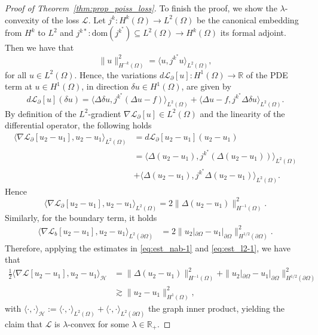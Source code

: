 \documentclass[pdflatex]{sn-jnl}%
\begin{document}
\begin{proof}[Proof of Theorem~\ref{thm:prop_poiss_loss}]
To finish the proof, we show the $\lambda$-convexity of the loss $\mathcal{L}$. Let $j^k:H^k(\Omega)\rightarrow L^2(\Omega)$ be the canonical embedding from $H^k$ to $L^2$ and $j^{k*}:\mathrm{dom}(j^{k^*})\subseteq L^2(\Omega)\rightarrow H^k(\Omega)$ its formal adjoint. Then we have that 
\begin{equation}
    \|u\|_{H^{-k}(\Omega)}^2 = \langle u, j^{k^*} u\rangle_{L^2(\Omega)},
\end{equation}
for all $u\in L^2(\Omega)$. Hence, the variations $d\mathcal{L}_\partial[u]:H^1(\Omega)\rightarrow\mathbb{R}$ of the PDE term at $u\in H^1(\Omega)$, in direction $\delta u\in H^1(\Omega)$, are given by
\begin{equation}
    d\mathcal{L}_\partial[u](\delta u) =  \langle \Delta \delta u, j^{k^*} (\Delta u -f)\rangle_{L^2(\Omega)}+\langle \Delta u -f, j^{k^*} \Delta \delta u \rangle_{L^2(\Omega)}.
\end{equation}
By definition of the $L^2$-gradient $\nabla\mathcal{L}_\partial[u]\in L^2(\Omega)$ and the linearity of the differential operator, the following holds
\begin{equation}
\begin{aligned}
        \langle \nabla\mathcal{L}_\partial[u_2-u_1],u_2-u_1\rangle_{L^2(\Omega)} &=d\mathcal{L}_\partial[u_2-u_1](u_2-u_1)\\&  
        =\langle \Delta (u_2-u_1), j^{k^*} (\Delta (u_2-u_1))\rangle_{L^2(\Omega)}\\&+\langle \Delta (u_2-u_1), j^{k^*} \Delta (u_2-u_1) \rangle_{L^2(\Omega)}.
    \end{aligned}
\end{equation}
Hence 
\begin{equation}
    \langle \nabla\mathcal{L}_\partial[u_2-u_1],u_2-u_1\rangle_{L^2(\Omega)} = 2\|\Delta (u_2-u_1)\|_{H^{-1}(\Omega)}^2.
\end{equation}
Similarly, for the boundary term, it holds
\begin{equation}
    \begin{aligned}
        \langle \nabla\mathcal{L}_b[u_2-u_1],u_2-u_1\rangle_{L^2(\partial\Omega)} &
        =2\|u_2|_{\partial\Omega}-u_1|_{\partial\Omega}\|_{H^{1/2}(\partial\Omega)}^2.
    \end{aligned}
\end{equation}
Therefore, applying the estimates in \eqref{eq:est_nab-1} and \ref{eq:est_l2-1}, we have that 
\begin{equation}
\begin{aligned}
         \frac{1}{2}\langle \nabla\mathcal{L}[u_2-u_1],u_2-u_1\rangle_{\mathcal{H}} & = \|\Delta (u_2-u_1)\|_{H^{-1}(\Omega)}^2+\|u_2|_{\partial\Omega}-u_1|_{\partial\Omega}\|_{H^{1/2}(\partial\Omega)}^2\\&
         \gtrsim \|u_2-u_1\|_{H^1(\Omega)}^2,
\end{aligned}
\end{equation}
with $\langle\cdot,\cdot \rangle_{\mathcal{H}}:=\langle\cdot,\cdot \rangle_{L^2(\Omega)}+\langle\cdot,\cdot \rangle_{L^2(\partial\Omega)}$ the graph inner product, 
yielding the claim that $\mathcal{L}$ is $\lambda$-convex for some $\lambda \in \mathbb{R}_+$. 


\end{proof}
\end{document}
